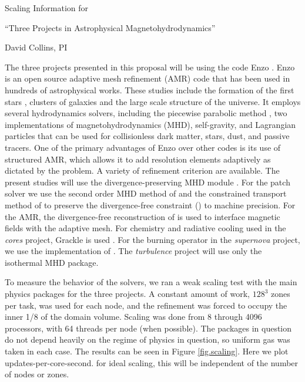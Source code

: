 \documentclass[11pt]{NSF}  %
\begin{document}
\begin{centering}
\begin{LARGE}
Scaling Information for 

``Three Projects in Astrophysical Magnetohydrodynamics''
\end{LARGE}

David Collins, PI

\end{centering}


\pagestyle{plain}

The three projects presented in this proposal will be using the code Enzo
\citep{Bryan14}.
Enzo  is an open source adaptive mesh refinement (AMR) code that
has been used in hundreds of astrophysical works.  These studies include the
formation of the first stars \citep{Abel02}, clusters of galaxies \citep{Xu11}
and the large scale structure of the universe.  It employs several hydrodynamics
solvers, including the piecewise parabolic method  \citep[PPM,][]{Colella84}, two implementations of
magnetohydrodynamics (MHD), self-gravity, and Lagrangian particles that can be used
for collisionless dark matter, stars, dust, and passive tracers.  One of the
primary advantages of Enzo over other codes is its use of structured AMR, which
allows it to add resolution elements adaptively as dictated by the problem.  A
variety of refinement criterion are available.   The present studies will use
the divergence-preserving MHD module \citep{Collins10}.  For the patch solver we
use the
second order MHD method of \citet{Li08a} and the constrained transport method of
\citet{Gardiner05} to preserve the divergence-free constraint (\divbo) to
machine precision.  For the AMR, the divergence-free reconstruction of \citet{Balsara01}
is used to interface magnetic fields with the adaptive mesh.  For chemistry and
radiative cooling used in the \emph{cores} project, Grackle is used
\citep{Smith17}.  For the burning operator in the \emph{supernova} project, we
use the implementation of \citep{Hristov18}. The \emph{turbulence} project will
use only the isothermal MHD package.


To measure the behavior of the solvers, we ran a weak scaling test with the main
physics packages for the three projects.  
A constant amount of
work, $128^3$ zones per task, was used for each node, and the refinement was forced to
occupy the inner 1/8 of the domain volume.  Scaling was done from 8 through 4096
processors, with 64 threads per node (when possible).
The packages in question do not depend heavily on the regime of
physics in question, so uniform gas was taken in each case.  The results can be
seen in Figure \ref{fig.scaling}.  Here we plot updates-per-core-second.
for ideal scaling, this will be independent of the number of nodes or zones.  
\end{document}
